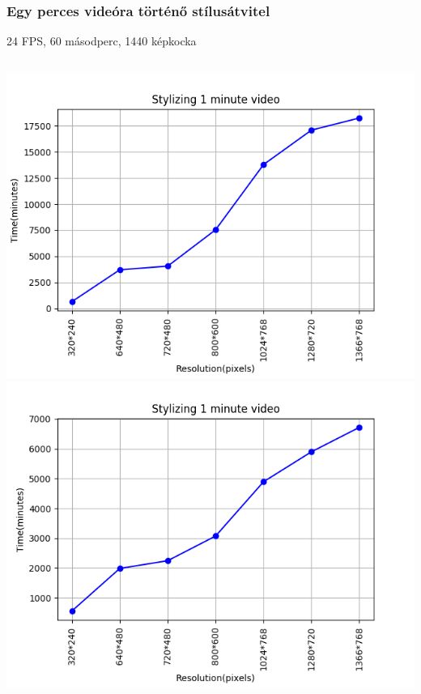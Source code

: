 \documentclass{beamer}
\begin{document}
	\begin{frame}
		\frametitle{Egy perces videóra történő stílusátvitel}
		24 FPS, 60 másodperc, 1440 képkocka
		\begin{center}
			\begin{columns}
				\includegraphics[scale=0.42]{one_min_video_opt_flow.png}
				\includegraphics[scale=0.42]{one_min_video.png}
			\end{columns}
		\end{center}
	\end{frame}
	
\end{document}

